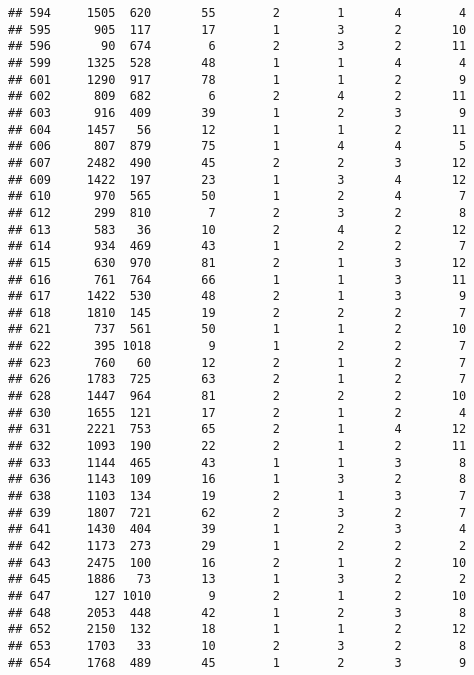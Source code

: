 \documentclass[]{article}
\begin{document}
\begin{verbatim}
## 594     1505  620       55        2        1       4        4
## 595      905  117       17        1        3       2       10
## 596       90  674        6        2        3       2       11
## 599     1325  528       48        1        1       4        4
## 601     1290  917       78        1        1       2        9
## 602      809  682        6        2        4       2       11
## 603      916  409       39        1        2       3        9
## 604     1457   56       12        1        1       2       11
## 606      807  879       75        1        4       4        5
## 607     2482  490       45        2        2       3       12
## 609     1422  197       23        1        3       4       12
## 610      970  565       50        1        2       4        7
## 612      299  810        7        2        3       2        8
## 613      583   36       10        2        4       2       12
## 614      934  469       43        1        2       2        7
## 615      630  970       81        2        1       3       12
## 616      761  764       66        1        1       3       11
## 617     1422  530       48        2        1       3        9
## 618     1810  145       19        2        2       2        7
## 621      737  561       50        1        1       2       10
## 622      395 1018        9        1        2       2        7
## 623      760   60       12        2        1       2        7
## 626     1783  725       63        2        1       2        7
## 628     1447  964       81        2        2       2       10
## 630     1655  121       17        2        1       2        4
## 631     2221  753       65        2        1       4       12
## 632     1093  190       22        2        1       2       11
## 633     1144  465       43        1        1       3        8
## 636     1143  109       16        1        3       2        8
## 638     1103  134       19        2        1       3        7
## 639     1807  721       62        2        3       2        7
## 641     1430  404       39        1        2       3        4
## 642     1173  273       29        1        2       2        2
## 643     2475  100       16        2        1       2       10
## 645     1886   73       13        1        3       2        2
## 647      127 1010        9        2        1       2       10
## 648     2053  448       42        1        2       3        8
## 652     2150  132       18        1        1       2       12
## 653     1703   33       10        2        3       2        8
## 654     1768  489       45        1        2       3        9

\end{verbatim}
\end{document}
